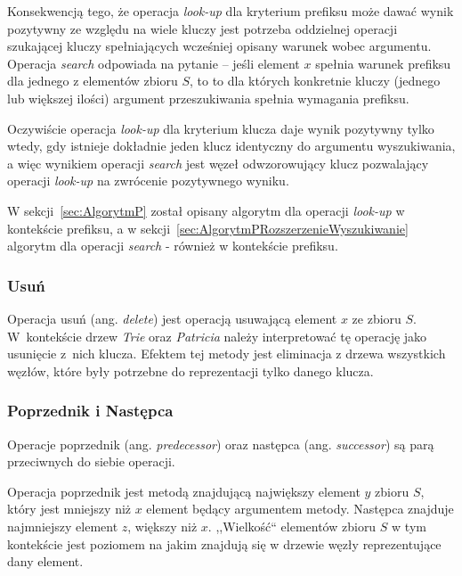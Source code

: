 		Konsekwencją tego, że operacja \emph{look-up} dla kryterium prefiksu może dawać wynik pozytywny ze względu na wiele kluczy jest potrzeba oddzielnej operacji szukającej kluczy spełniających wcześniej opisany warunek wobec argumentu. Operacja \emph{search} odpowiada na pytanie -- jeśli element $x$ spełnia warunek prefiksu dla jednego z elementów zbioru $S$, to to dla których konkretnie kluczy (jednego lub większej ilości) argument przeszukiwania spełnia wymagania prefiksu. 
		
		Oczywiście operacja \emph{look-up} dla kryterium klucza daje wynik pozytywny tylko wtedy, gdy istnieje dokładnie jeden klucz identyczny do argumentu wyszukiwania, a więc wynikiem operacji \emph{search} jest węzeł odwzorowujący klucz pozwalający operacji \emph{look-up} na zwrócenie pozytywnego wyniku.
		
		W sekcji~\ref{sec:AlgorytmP} został opisany algorytm dla operacji \emph{look-up} w kontekście prefiksu, a w sekcji~\ref{sec:AlgorytmPRozszerzenieWyszukiwanie} algorytm dla operacji \emph{search} - również w kontekście prefiksu. 
		
		\subsubsection{Usuń}\label{sec:czescTeoretycznaPrzegladDrzewTrieOperacjeDeleteUsun}
		
		Operacja usuń (ang. \emph{delete}) jest operacją usuwającą element $x$ ze zbioru $S$. W~kontekście drzew \emph{Trie} oraz \emph{Patricia} należy interpretować tę operację jako usunięcie z~nich klucza. Efektem tej metody jest eliminacja z drzewa wszystkich węzłów, które były potrzebne do reprezentacji tylko danego klucza.
		
		\subsubsection{Poprzednik i Następca}\label{sec:czescTeoretycznaPrzegladDrzewTrieOperacjePredecessorPoprzednikSuccessorNastepca}
		
		Operacje poprzednik (ang. \emph{predecessor}) oraz następca (ang. \emph{successor}) są parą przeciwnych do siebie operacji. 
		
		Operacja poprzednik jest metodą znajdującą największy element $y$ zbioru $S$, który jest mniejszy niż $x$ element będący argumentem metody. Następca znajduje najmniejszy element $z$, większy niż $x$. ,,Wielkość`` elementów zbioru $S$ w tym kontekście jest poziomem na jakim znajdują się w drzewie węzły reprezentujące dany element.
		

